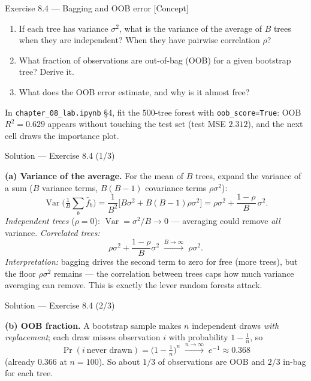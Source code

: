 \documentclass[aspectratio=169,11pt]{beamer}
\begin{document}
\begin{frame}{Exercise 8.4 --- Bagging and OOB error [Concept]}
\begin{exercise}
\begin{enumerate}
  \item If each tree has variance $\sigma^2$, what is the variance of the average of $B$ trees when they are independent? When they have pairwise correlation $\rho$?
  \item What fraction of observations are out-of-bag (OOB) for a given bootstrap tree? Derive it.
  \item What does the OOB error estimate, and why is it almost free?
\end{enumerate}
\end{exercise}
\begin{labnote}
In \texttt{chapter\_08\_lab.ipynb} \S4, fit the $500$-tree forest with \texttt{oob\_score=True}: OOB $R^2=0.629$ appears without touching the test set (test MSE $2.312$), and the next cell draws the importance plot.
\end{labnote}
\end{frame}

\begin{frame}{Solution --- Exercise 8.4 (1/3)}
\begin{solutionbox}
\textbf{(a) Variance of the average.} For the mean of $B$ trees, expand the variance of a sum ($B$ variance terms, $B(B-1)$ covariance terms $\rho\sigma^2$):
\[ \operatorname{Var}\!\Big(\tfrac1B\sum_b \hat f_b\Big)=\frac{1}{B^2}\Big[B\sigma^2+B(B-1)\rho\sigma^2\Big]
=\rho\sigma^2+\frac{1-\rho}{B}\,\sigma^2. \]
\emph{Independent trees} ($\rho=0$): $\operatorname{Var}=\sigma^2/B\to0$ --- averaging could remove \emph{all} variance. \emph{Correlated trees:}
\[ \rho\sigma^2+\frac{1-\rho}{B}\sigma^2 \;\xrightarrow{B\to\infty}\; \rho\sigma^2. \]
\emph{Interpretation:} bagging drives the second term to zero for free (more trees), but the floor $\rho\sigma^2$ remains --- the correlation between trees caps how much variance averaging can remove. This is exactly the lever random forests attack.
\end{solutionbox}
\end{frame}

\begin{frame}{Solution --- Exercise 8.4 (2/3)}
\begin{solutionbox}
\textbf{(b) OOB fraction.} A bootstrap sample makes $n$ independent draws \emph{with replacement}; each draw misses observation $i$ with probability $1-\tfrac1n$, so
\[ \Pr(i\ \text{never drawn})=\Big(1-\tfrac1n\Big)^{n}\;\xrightarrow{n\to\infty}\; e^{-1}\approx 0.368 \]
(already $0.366$ at $n=100$). So about $1/3$ of observations are OOB and $2/3$ in-bag for each tree.
\end{solutionbox}
\end{frame}
\end{document}
